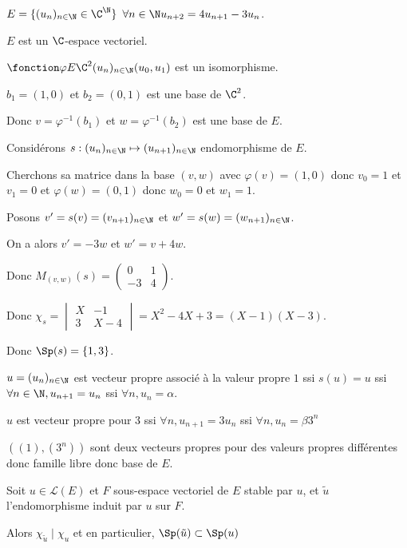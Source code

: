 \begin{exemple}
    $E = \{(u_n)_{n \in \N} \in \C^{\N}\}$ $\forall n \in \N u_{n + 2} = 4 u_{n + 1} - 3 u_n$.

    $E$ est un $\C$-espace vectoriel. 

    $\fonction \varphi E {\C^2} {(u_n)_{n \in \N}} {(u_0, u_1)}$ est un isomorphisme.

    $b_1 = (1, 0)$ et $b_2 = (0, 1)$ est une base de $\C^2$.

    Donc $v = \varphi^{-1} (b_1) $ et $w = \varphi^{-1} (b_2)$ est une base de $E$.

    Considérons $s : (u_n)_{n \in \N} \mapsto (u_{n + 1})_{n \in \N}$ endomorphisme de $E$.

    Cherchons sa matrice dans la base $(v, w)$ avec $\varphi(v) = (1, 0)$ donc 
    $v_0 = 1$ et $v_1 = 0$    
    et $\varphi(w) = (0, 1)$ donc $w_0 = 0$ et $w_1 = 1$.

    Posons $v' = s(v) = (v_{n + 1})_{n \in \N}$ et $w' = s(w) = (w_{n + 1})_{n \in \N}$.

    On a alors $v' = -3w$ et $w' = v + 4w$.

    Donc $M_{(v, w)}(s) = \begin{pmatrix}
        0 & 1 \\
        -3 & 4
    \end{pmatrix}$.

    Donc $\chi_s = \begin{vmatrix}
        X & -1 \\
        3 & X - 4
    \end{vmatrix} = X^2 - 4X + 3 = (X - 1)(X - 3)$.

    Donc $\Sp(s) = \{1, 3\}$.


    $u = (u_n)_{n \in \N}$ est vecteur propre associé à la valeur propre $1$ ssi 
    $s(u) = u$ ssi $\forall n \in \N, u_{n + 1} = u_n$ ssi $\forall n, u_n = \alpha$. 

    $u$ est vecteur propre pour $3$ ssi $\forall n, u_{n + 1} = 3 u_n$ ssi $\forall n, u_n = \beta 3^n$

    $((1), (3^n))$ sont deux vecteurs propres pour des valeurs propres différentes donc famille libre donc base de 
    $E$. 
\end{exemple}


\begin{proposition}{}{}
    Soit $u \in \mathscr L(E)$ et $F$ sous-espace vectoriel de $E$ stable par $u$, et $\tilde u$
    l'endomorphisme induit par $u$ sur $F$. 

    Alors 
    $\chi_{\tilde u} \mid \chi_u$ et en particulier, $\Sp(\tilde u) \subset \Sp (u)$
\end{proposition}

